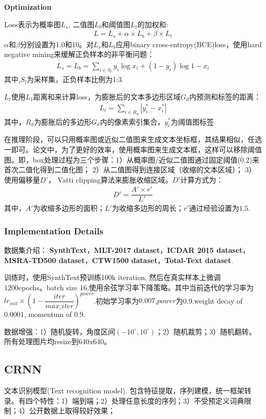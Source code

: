 \documentclass{article}
\begin{document}
\textbf{Optimization}

Loss表示为概率图$L_s$, 二值图$ L_b $和阈值图$L_t$的加权和:
\begin{align}
L=L_s + \alpha \times L_b + \beta \times L_t
\end{align}
$\alpha$和$\beta$分别设置为1.0和10。对$L_s$和$L_b$应用binary cross-entropy(BCE)loss，使用hard negative mining来缓解正负样本的非平衡问题：
\begin{align}
L_s = L_b = \sum_{i \in S_l}{y_i \log{x_i} + (1 - y_i) \log{1 - x_i}} 
\end{align}
其中,$S_l$为采样集，正负样本比例为1:3.

$L_t$使用$L_1$距离和来计算loss，为膨胀后的文本多边形区域$G_d$内预测和标签的距离：
\begin{align}
L_t = \sum_{i \in R_d}{\left| y_i^* - x_i^* \right|}
\end{align}
其中，$R_d$为膨胀后的多边形$G_d$内的像素索引集合，$y_i^*$为阈值图标签

在推理阶段，可以只用概率图或近似二值图来生成文本坐标框，其结果相似，任选一即可。论文中，为了更好的效率，使用概率图来生成文本框，这样可以移除阈值图。即，box处理过程为三个步骤：1）从概率图/近似二值图通过固定阈值(0.2)来首次二值化得到二值化图； 2）从二值图得到连接区域（收缩的文本区域）； 3）使用偏移量$D'$， Vatti clipping算法来膨胀收缩区域。$D'$计算方式为：
\begin{align}
D' = \dfrac{A' \times r'}{L'}
\end{align}
其中，$A'$为收缩多边形的面积；$L'$为收缩多边形的周长；$r'$通过经验设置为$1.5$.

\subsubsection{Implementation Details}
数据集介绍： \textbf{SynthText}，\textbf{MLT-2017 dataset}，\textbf{ICDAR 2015 dataset}，\textbf{MSRA-TD500 dataset}，\textbf{CTW1500 dataset}，\textbf{Total-Text dataset}.

训练时，使用SynthText预训练100k iteration, 然后在真实样本上微调1200epochs。batch size 16,使用余弦学习率下降策略。其中当前迭代的学习率为$lr_{init} \times (1 - \dfrac{iter}{max\_iter})^{power}$.初始学习率为$0.007$,$power$为0.9.weight decay of 0.0001, momentum of 0.9.

数据增强：1）随机旋转，角度区间$(-10^\circ,10^\circ)$；2）随机裁剪；3）随机翻转。所有处理图片均resize到640x640。

\subsection{CRNN}
文本识别模型(Text recognition model). 包含特征提取，序列建模，统一框架转录。有四个特性：1）端到端；2）处理任意长度的序列；3）不受预定义词典限制；4）公开数据上取得较好效果；
\end{document}
